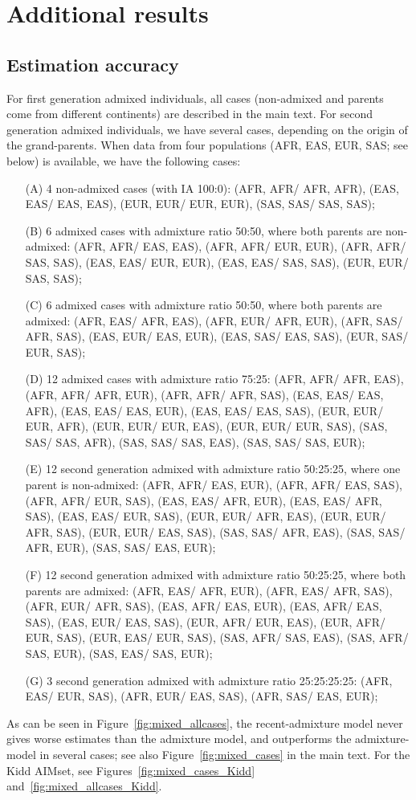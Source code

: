 \documentclass[12pt]{article}
\theoremstyle{definition}
\begin{document}
\section{Additional results}

\subsection{Estimation accuracy}
For first generation admixed individuals, all cases (non-admixed and
parents come from different continents) are described in the main
text. For second generation admixed individuals, we have several
cases, depending on the origin of the grand-parents.  When data from
four populations (AFR, EAS, EUR, SAS; see below) is available, we have
the following cases:
\begin{itemize}
\item[(A)] 4 non-admixed cases (with IA 100:0): (AFR, AFR/ AFR, AFR),
  (EAS, EAS/ EAS, EAS), (EUR, EUR/ EUR, EUR), (SAS, SAS/ SAS, SAS);
\item[(B)] 6 admixed cases with admixture ratio 50:50, where both parents
  are non-admixed: (AFR, AFR/ EAS, EAS), (AFR, AFR/ EUR, EUR), (AFR,
  AFR/ SAS, SAS), (EAS, EAS/ EUR, EUR), (EAS, EAS/ SAS, SAS), (EUR,
  EUR/ SAS, SAS);
\item[(C)] 6 admixed cases with admixture ratio 50:50, where both parents
  are admixed: (AFR, EAS/ AFR, EAS), (AFR, EUR/ AFR, EUR), (AFR, SAS/
  AFR, SAS), (EAS, EUR/ EAS, EUR), (EAS, SAS/ EAS, SAS), (EUR, SAS/
  EUR, SAS);
\item[(D)] 12 admixed cases with admixture ratio 75:25: (AFR, AFR/ AFR,
  EAS), (AFR, AFR/ AFR, EUR), (AFR, AFR/ AFR, SAS), (EAS, EAS/ EAS,
  AFR), (EAS, EAS/ EAS, EUR), (EAS, EAS/ EAS, SAS), (EUR, EUR/ EUR,
  AFR), (EUR, EUR/ EUR, EAS), (EUR, EUR/ EUR, SAS), (SAS, SAS/ SAS,
  AFR), (SAS, SAS/ SAS, EAS), (SAS, SAS/ SAS, EUR);
\item[(E)] 12 second generation admixed with admixture ratio 50:25:25,
  where one parent is non-admixed: (AFR, AFR/ EAS, EUR), (AFR, AFR/
  EAS, SAS), (AFR, AFR/ EUR, SAS), (EAS, EAS/ AFR, EUR), (EAS, EAS/
  AFR, SAS), (EAS, EAS/ EUR, SAS), (EUR, EUR/ AFR, EAS), (EUR, EUR/
  AFR, SAS), (EUR, EUR/ EAS, SAS), (SAS, SAS/ AFR, EAS), (SAS, SAS/ AFR,
  EUR), (SAS, SAS/ EAS, EUR);
\item[(F)] 12 second generation admixed with admixture ratio 50:25:25,
  where both parents are admixed: (AFR, EAS/ AFR, EUR), (AFR, EAS/
  AFR, SAS), (AFR, EUR/ AFR, SAS), (EAS, AFR/ EAS, EUR), (EAS, AFR/
  EAS, SAS), (EAS, EUR/ EAS, SAS), (EUR, AFR/ EUR, EAS), (EUR, AFR/
  EUR, SAS), (EUR, EAS/ EUR, SAS), (SAS, AFR/ SAS, EAS), (SAS, AFR/
  SAS, EUR), (SAS, EAS/ SAS, EUR);
\item[(G)] 3 second generation admixed with admixture ratio
  25:25:25:25: (AFR, EAS/ EUR, SAS), (AFR, EUR/ EAS, SAS), (AFR, SAS/
  EAS, EUR);
\end{itemize}
As can be seen in Figure~\ref{fig:mixed_allcases}, the
recent-admixture model never gives worse estimates than the admixture
model, and outperforms the admixture-model in several cases; see also
Figure~\ref{fig:mixed_cases} in the main text.  For the Kidd AIMset,
see Figures~\ref{fig:mixed_cases_Kidd}
and~\ref{fig:mixed_allcases_Kidd}.
\end{document}
